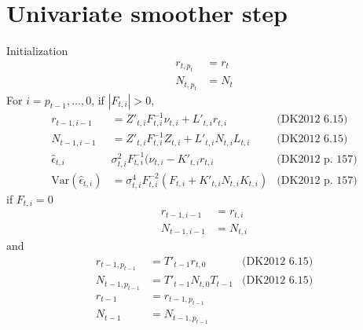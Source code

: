\documentclass{article}
\begin{document}
\section{Univariate smoother step}
Initialization
\begin{align*}
  r_{t, p_t} &= r_t \\
  N_{t,p_t} &= N_t
\end{align*}
For $i = p_{t-1},\ldots,0$, if $|F_{t,i}| > 0$,
\begin{align*}
  r_{t-1,i-1} &= Z'_{t,i}F^{-1}_{t,i}\nu_{t,i} + L'_{t,i}r_{t,i} & \mbox{(DK2012 6.15)}\\
  N_{t-1,i-1} &= Z'_{t,i}F^{-1}_{t,i}Z_{t,i} + L'_{t,i}N_{t,i}L_{t,i} & \mbox{(DK2012 6.15)}\\
  \hat\epsilon_{t,i} & \sigma^2_{t,i}F^{-1}_{t,i}(\nu_{t,i} -
                       K'_{t,i}r_{t,i} & \mbox{(DK2012 p. 157)}\\
  \mbox{Var}(\hat\epsilon_{t,i}) &= \sigma^4_{t,i}F^{-2}_{t,i}(F_{t,i}
                                   + K'_{t,i}N_{t,i}K_{t,i}) & \mbox{(DK2012 p. 157)} 
\end{align*}
if $F_{t,i} = 0$
\begin{align*}
  r_{t-1,i-1} &= r_{t,i} \\
  N_{t-1,i-1} &= N_{t,i}
\end{align*}
and
\begin{align*}
  r_{t-1,p_{t-1}} &= T'_{t-1}r_{t,0} & \mbox{(DK2012 6.15)}\\
  N_{t-1,p_{t-1}} &= T'_{t-1}N_{t,0}T_{t-1}  & \mbox{(DK2012 6.15)}\\
  r_{t-1} &= r_{t-1, p_{t-1}}\\
  N_{t-1} &= N_{t-1, p_{t-1}}
\end{align*}
\end{document}
